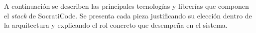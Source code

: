 A continuación se describen las principales tecnologías y librerías que componen el \textit{stack} de SocratiCode. Se presenta cada pieza justificando su elección dentro de la arquitectura y explicando el rol concreto que desempeña en el sistema.
